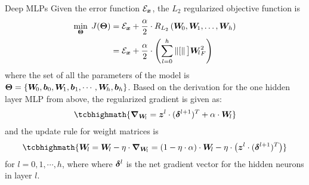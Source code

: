 \begin{frame}{Deep MLPs}
%
Given the error function ${\mathcal E}_{{\boldsymbol x}}$, the $L_2$ regularized objective
function is
\begin{align*}
    \min_{{\bm \Theta}} \; J({\bm \Theta}) & =  {\mathcal E}_{{\boldsymbol x}} + \frac{\alpha}{2} \cdot
    R_{L_2}\left({\boldsymbol W}_{\!0}, {\boldsymbol W}_{\!1}, \ldots, {\boldsymbol W}_{h}\right)\\
    & = {\mathcal E}_{{\boldsymbol x}} +
    \frac{\alpha}{2} \cdot \left( \sum_{l=0}^h \left\lVert[\right\rVert\big]{{\boldsymbol W}_{\!l}}_{F}^2 \right)
\end{align*}
where the set of all the parameters of the model is 
${\bm \Theta} = \left\{{\boldsymbol W}_{\!0}, {\boldsymbol b}_{0}, {\boldsymbol W}_{\!1}, {\boldsymbol b}_{1}, \cdots, 
{\boldsymbol W}_{\!h}, {\boldsymbol b}_{h}\right\}$.
Based on the derivation for the one hidden layer MLP from above, the
regularized gradient is given as:
\begin{align}
    \tcbhighmath{
        \bgrad_{\bW_{\!l}}  = \bz^{l} \cdot (\bdelta^{l+1})^T + \alpha \cdot
\bW_{\!l}}
\end{align}
and the update rule for weight matrices is
\begin{align}
    \tcbhighmath{
    \bW_{\!l} = \bW_{\!l} - \eta \cdot \bgrad_{\bW_{\!l}}
     = (1-\eta\cdot\alpha) \cdot \bW_{\!l} - \eta \cdot \lB(\bz^l \cdot
 (\bdelta^{l+1})^T \rB)}
\end{align}
for $l=0,1,\cdots,h$, where
where ${\bm \delta}^{l}$ 
is the net gradient vector for the hidden neurons in layer $l$.
\end{frame}
